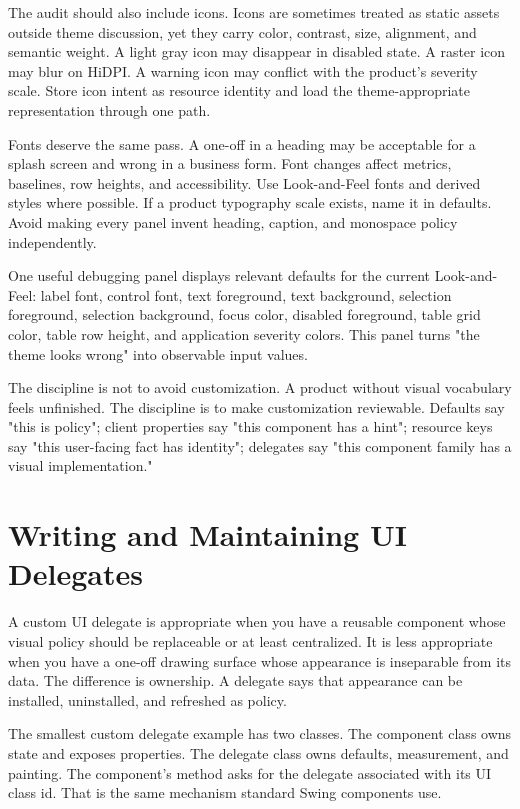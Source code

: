 The audit should also include icons. Icons are sometimes treated as static assets outside theme discussion, yet they carry color, contrast, size, alignment, and semantic weight. A light gray icon may disappear in disabled state. A raster icon may blur on HiDPI. A warning icon may conflict with the product's severity scale. Store icon intent as resource identity and load the theme-appropriate representation through one path.

Fonts deserve the same pass. A one-off  in a heading may be acceptable for a splash screen and wrong in a business form. Font changes affect metrics, baselines, row heights, and accessibility. Use Look-and-Feel fonts and derived styles where possible. If a product typography scale exists, name it in defaults. Avoid making every panel invent heading, caption, and monospace policy independently.

One useful debugging panel displays relevant defaults for the current Look-and-Feel: label font, control font, text foreground, text background, selection foreground, selection background, focus color, disabled foreground, table grid color, table row height, and application severity colors. This panel turns "the theme looks wrong" into observable input values.

The discipline is not to avoid customization. A product without visual vocabulary feels unfinished. The discipline is to make customization reviewable. Defaults say "this is policy"; client properties say "this component has a hint"; resource keys say "this user-facing fact has identity"; delegates say "this component family has a visual implementation."

\section{Writing and Maintaining UI Delegates}

A custom UI delegate is appropriate when you have a reusable component whose visual policy should be replaceable or at least centralized. It is less appropriate when you have a one-off drawing surface whose appearance is inseparable from its data. The difference is ownership. A delegate says that appearance can be installed, uninstalled, and refreshed as policy.

The smallest custom delegate example has two classes. The component class owns state and exposes properties. The delegate class owns defaults, measurement, and painting. The component's  method asks  for the delegate associated with its UI class id. That is the same mechanism standard Swing components use.

